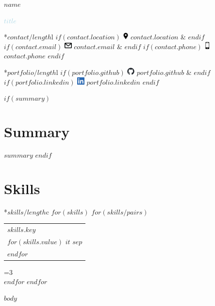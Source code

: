 \documentclass[10pt]{article}
\begin{document}
\begin{center}
{\Huge \textbf{$name$}}

{\Large \textcolor{lightblue}{$title$}}

\begin{tabular}{*{$contact/length$}{l}}
    $if(contact.location)$
        \includegraphics[height=11pt]{logos/location.png} $contact.location$ &
    $endif$
    $if(contact.email)$
        \includegraphics[height=11pt]{logos/mail.png} $contact.email$ &
    $endif$
    $if(contact.phone)$
        \includegraphics[height=11pt]{logos/mobile.png} $contact.phone$
    $endif$
\end{tabular}

\begin{tabular}{*{$portfolio/length$}{l}}
    $if(portfolio.github)$
        \includegraphics[height=11pt]{logos/github-mark.png} $portfolio.github$ &
    $endif$
    $if(portfolio.linkedin)$
        \includegraphics[height=11pt]{logos/LI-In-Bug.png} $portfolio.linkedin$
    $endif$
\end{tabular}
\end{center}

$if(summary)$
\section{Summary}
$summary$
$endif$

\bigskip

\section{Skills}
\begin{tabular}{*{$skills/length$}{c}}
    \setcounter{skillCounter}{0}
    $for(skills)$
        $for(skills/pairs)$
            \begin{tabular}[t]{l}
                \textbf{$skills.key$}\\
                $for(skills.value)$
                    $it$ $sep$\\
                $endfor$
            \end{tabular}
            \ifnum\value{skillCounter}=3
                \\ %
                \setcounter{skillCounter}{0} %
            \fi
        $endfor$
    $endfor$
\end{tabular}

$body$
\end{document}

